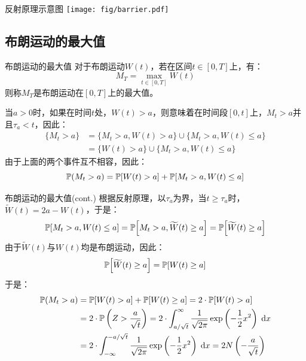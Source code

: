\documentclass[t]{beamer}
\newcommand{\dif}{{\;\rm d}}
\renewcommand{\Pr}{\mathbb{P}}
\begin{document}
\begin{frame}{反射原理示意图}
  \centering
	\texttt{[image: fig/barrier.pdf]}
\end{frame}

\subsection{布朗运动的最大值}
\begin{frame}{布朗运动的最大值}
  对于布朗运动$W(t)$，若在区间$t\in[0,T]$上，有：
  $$M_T=\max_{t\in [0,T]}W(t)$$
    则称$M_T$是布朗运动在$[0,T]$上的最大值。

    当$a>0$时，如果在时间$t$处，$W(t)>a$，则意味着在时间段$[0,t]$上，$M_t>a$并且$\tau_a<t$，因此：
\begin{equation*}
\begin{split}
\{M_t>a\}&=\{M_t>a,W(t)>a\}\cup\{M_t>a, W(t)\le a\}\\
&=\{W(t)>a\}\cup\{M_t>a, W(t)\le a\}
\end{split}
\end{equation*}
由于上面的两个事件互不相容，因此：
\begin{equation*}
\Pr(M_t>a)=\Pr\qty[W(t)>a]+\Pr\qty[M_t>a, W(t)\le a]
\end{equation*}
\end{frame}


\begin{frame}{布朗运动的最大值(cont.)}
  根据反射原理，以$\tau_a$为界，当$t\ge \tau_a$时，$\widetilde{W}(t)=2a-W(t)$，于是：
  \begin{equation*}
  \Pr\qty[M_t>a, W(t)\le a]=\Pr\qty[M_t>a,\widetilde W(t)\ge a]=\Pr\qty[\widetilde W(t)\ge a]
  \end{equation*}
  由于$\widetilde W(t)$与$W(t)$均是布朗运动，因此：
  \[\Pr\qty[\widetilde W(t)\ge a]=\Pr\qty[W(t)\ge a] \]
  于是：
  \begin{equation*}
  \begin{split}
  \Pr(M_t>a)&=\Pr\qty[W(t)>a]+\Pr\qty[W(t)\ge a]=2\cdot\Pr\qty[W(t)> a]\\
  &=2\cdot \Pr\left(Z>\frac{a}{\sqrt{t}}\right)=2\cdot \int_{a/\sqrt{t}}^{\infty} \frac{1}{\sqrt{2\pi}}\exp\left(-\frac{1}{2}x^2\right)\dif x \\
  &=2\cdot \int^{-a/\sqrt{t}}_{-\infty} \frac{1}{\sqrt{2\pi}}\exp\left(-\frac{1}{2}x^2\right)\dif x=2N\left( -\frac{a}{\sqrt{t}}\right) 
  \end{split}
  \end{equation*}
\end{frame}
\end{document}
